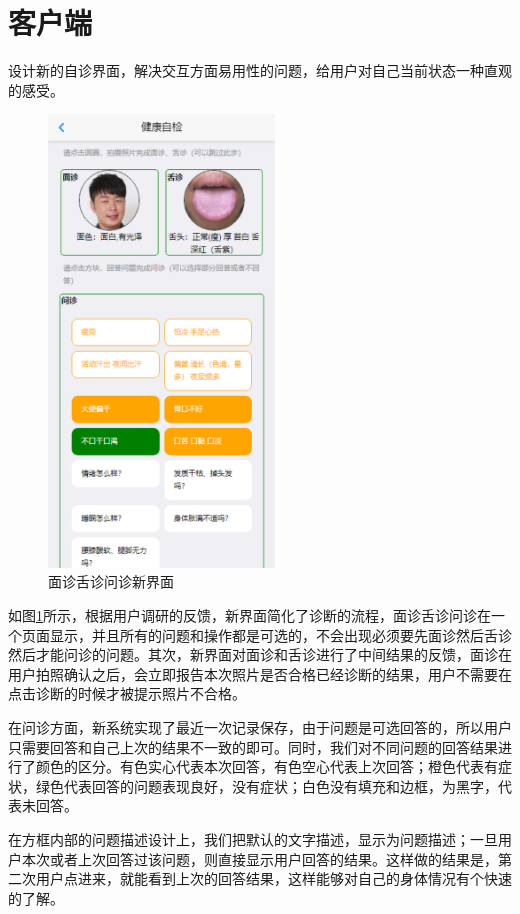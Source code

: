 \section{客户端}
设计新的自诊界面，解决交互方面易用性的问题，给用户对自己当前状态一种直观的感受。
\begin{figure}[ht]
    \centering
    \includegraphics[height=12cm]{images/diag.png}
    \caption{面诊舌诊问诊新界面}
    \label{fig:diag_new}
\end{figure}

如图\ref{fig:diag_new}所示，根据用户调研的反馈，新界面简化了诊断的流程，面诊舌诊问诊在一个页面显示，并且所有的问题和操作都是可选的，不会出现必须要先面诊然后舌诊然后才能问诊的问题。其次，新界面对面诊和舌诊进行了中间结果的反馈，面诊在用户拍照确认之后，会立即报告本次照片是否合格已经诊断的结果，用户不需要在点击诊断的时候才被提示照片不合格。

在问诊方面，新系统实现了最近一次记录保存，由于问题是可选回答的，所以用户只需要回答和自己上次的结果不一致的即可。同时，我们对不同问题的回答结果进行了颜色的区分。有色实心代表本次回答，有色空心代表上次回答；橙色代表有症状，绿色代表回答的问题表现良好，没有症状；白色没有填充和边框，为黑字，代表未回答。

在方框内部的问题描述设计上，我们把默认的文字描述，显示为问题描述；一旦用户本次或者上次回答过该问题，则直接显示用户回答的结果。这样做的结果是，第二次用户点进来，就能看到上次的回答结果，这样能够对自己的身体情况有个快速的了解。

